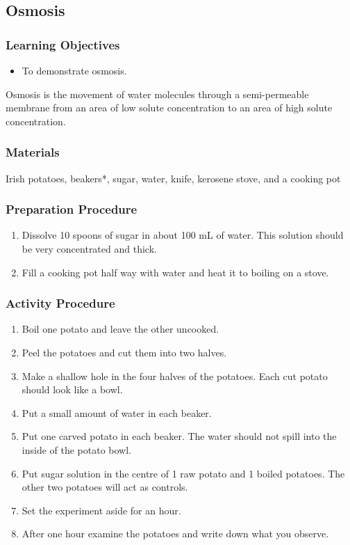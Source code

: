 \subsection{Osmosis}

\subsubsection*{Learning Objectives}
\begin{itemize}
\item{To demonstrate osmosis.}
\end{itemize}


Osmosis is the movement of water molecules through a semi-permeable membrane from an area of low solute concentration to an area of high solute concentration.

\subsubsection*{Materials}
Irish potatoes, beakers*, sugar, water, knife, kerosene stove, and a cooking pot

\subsubsection*{Preparation Procedure}
\begin{enumerate}
\item{Dissolve 10 spoons of sugar in about 100 mL of water. This solution should be very concentrated and thick.}
\item{Fill a cooking pot half way with water and heat it to boiling on a stove.}
\end{enumerate}

\subsubsection*{Activity Procedure}
\begin{enumerate}
\item{Boil one potato and leave the other uncooked.}
\item{Peel the potatoes and cut them into two halves.}
\item{Make a shallow hole in the four halves of the potatoes. Each cut potato should look like a bowl.}
\item{Put a small amount of water in each beaker.}
\item{Put one carved potato in each beaker. The water should not spill into the inside of the potato bowl.}
\item{Put sugar solution in the centre of 1 raw potato and 1 boiled potatoes. The other two potatoes will act as controls.}
\item{Set the experiment aside for an hour.}
\item{After one hour examine the potatoes and write down what you observe.}
\end{enumerate}


